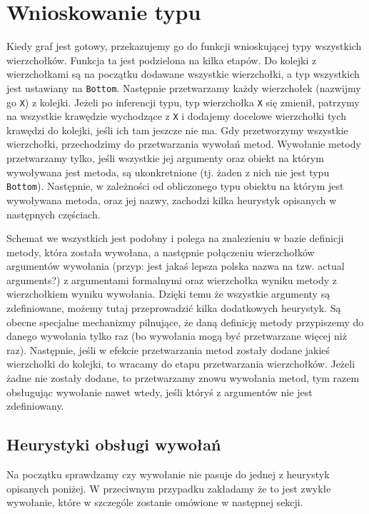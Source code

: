 \documentclass[declaration,shortabstract]{iithesis}
\begin{document}

\section{Wnioskowanie typu}

Kiedy graf jest gotowy, przekazujemy go do funkcji wnioskującej typy wszystkich wierzchołków. Funkcja ta jest podzielona na kilka etapów.
Do kolejki z wierzchołkami są na początku dodawane wszystkie wierzchołki, a typ wszystkich jest ustawiany na \texttt{Bottom}.
Następnie przetwarzamy każdy wierzchołek (nazwijmy go \texttt{X}) z kolejki.
Jeżeli po inferencji typu, typ wierzchołka \texttt{X} się zmienił, patrzymy na wszystkie krawędzie wychodzące z \texttt{X} i dodajemy docelowe wierzchołki tych krawędzi do kolejki, jeśli ich tam jeszcze nie ma.
Gdy przetworzymy wszystkie wierzchołki, przechodzimy do przetwarzania wywołań metod.
Wywołanie metody przetwarzamy tylko, jeśli wszystkie jej argumenty oraz obiekt na którym wywoływana jest metoda, są ukonkretnione (tj. żaden z nich nie jest typu \texttt{Bottom}).
Następnie, w zależności od obliczonego typu obiektu na którym jest wywoływana metoda, oraz jej nazwy, zachodzi kilka heurystyk opisanych w następnych częściach.

Schemat we wszystkich jest podobny i polega na znalezieniu w bazie definicji metody, która została wywołana, a następnie połączeniu wierzchołków argumentów wywołania (przyp: jest jakaś lepsza polska nazwa na tzw. actual arguments?) z argumentami formalnymi oraz wierzchołka wyniku metody z wierzchołkiem wyniku wywołania.
Dzięki temu że wszystkie argumenty są zdefiniowane, możemy tutaj przeprowadzić kilka dodatkowych heurystyk.
Są obecne specjalne mechanizmy pilnujące, że daną definicję metody przypiszemy do danego wywołania tylko raz (bo wywołania mogą być przetwarzane więcej niż raz).
Następnie, jeśli w efekcie przetwarzania metod zostały dodane jakieś wierzchołki do kolejki, to wracamy do etapu przetwarzania wierzchołków.
Jeżeli żadne nie zostały dodane, to przetwarzamy znowu wywołania metod, tym razem obsługując wywołanie nawet wtedy, jeśli któryś z argumentów nie jest zdefiniowany.

\subsection{Heurystyki obsługi wywołań}

Na początku sprawdzamy czy wywołanie nie pasuje do jednej z heurystyk opisanych poniżej. W przeciwnym przypadku zakładamy że to jest zwykłe wywołanie, które w szczególe zostanie omówione w następnej sekcji.
\end{document}
